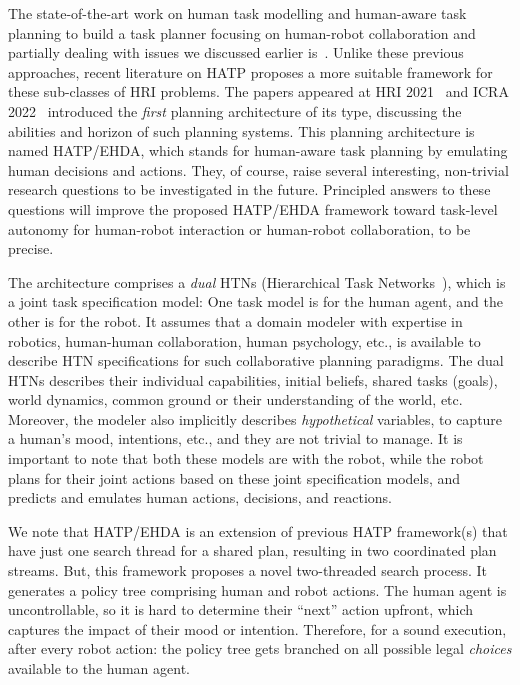 \documentclass[letterpaper]{article} %
\begin{document}
The state-of-the-art work on human task modelling and human-aware task planning to build a task planner focusing on human-robot collaboration and partially dealing with issues we discussed earlier is~\cite{alami2006toward,montreuil2007planning,alili2009planning,alili2009task,lallement2014hatp,de2015hatp,lallement2018hatp}.
Unlike these previous approaches, 
recent literature on HATP proposes a more suitable framework for these sub-classes of HRI problems. 
The papers appeared at HRI 2021~\cite{BuisanA21} and ICRA 2022~\cite{buisan:hal-03684211} introduced the \textit{first} planning architecture of its type, discussing the abilities and horizon of such planning systems. 
This planning architecture is named HATP/EHDA, which stands for human-aware task planning by emulating human decisions and actions. They, of course, raise several interesting, non-trivial research questions to be investigated in the future. 
Principled answers to these questions will improve the proposed HATP/EHDA framework toward task-level autonomy for human-robot interaction or human-robot collaboration, to be precise. 

The architecture comprises a \textit{dual} HTNs (Hierarchical Task Networks~\cite{naubooks0014222}), which is a joint task specification model: One task model is for the human agent, and the other is for the robot. 
It assumes that a domain modeler with expertise in robotics, human-human collaboration, human psychology, etc., is available to describe HTN specifications for such collaborative planning paradigms. 
The dual HTNs describes their individual capabilities, initial beliefs, shared tasks (goals), world dynamics, common ground or their understanding of the world, etc. Moreover, the modeler also implicitly describes \textit{hypothetical} variables, to capture a human's mood, intentions, etc., and they are not trivial to manage. 
It is important to note that both these models are with the robot, while the robot plans for their joint actions based on these joint specification models, and predicts and emulates human actions, decisions, and reactions.    

We note that HATP/EHDA is an extension of previous HATP framework(s) that have just one search thread for a shared plan, resulting in two coordinated plan streams. But, this framework proposes a novel two-threaded search process. 
It generates a policy tree comprising human and robot actions. 
The human agent is uncontrollable,
so it is hard to determine their ``next'' action upfront, which captures the impact of their mood or intention.
Therefore, for a sound execution, after every robot action: the policy tree gets branched on all possible legal \textit{choices} available to the human agent.
\end{document}
